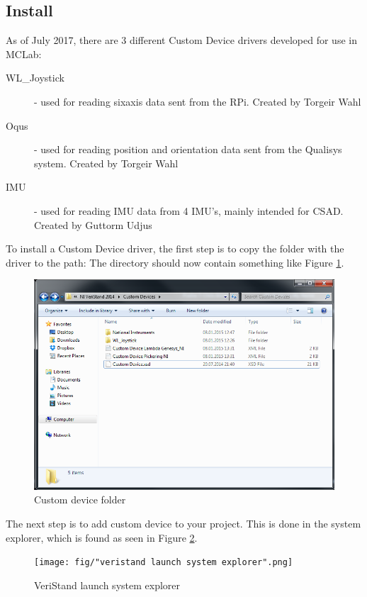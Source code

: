 \subsection{Install}\label{subsec: Installing custom device driver}
As of July 2017, there are 3 different Custom Device drivers developed for use in MCLab: 
\begin{description}
	\item [WL\_Joystick] - used for reading sixaxis data sent from the RPi. Created by Torgeir Wahl
	\item [Oqus] - used for reading position and orientation data sent from the Qualisys system. Created by Torgeir Wahl
	\item [IMU] - used for reading IMU data from 4 IMU's, mainly intended for CSAD. Created by Guttorm Udjus
\end{description}
To install a Custom Device driver, the first step is to copy the folder with the driver to the path: 
The directory should now contain something like Figure \ref{fig: custom device folder}.
\begin{figure}[htb!]
	\centering \includegraphics[scale=0.45]{fig/custom_devices_folder.png}
	\caption{Custom device folder}
	\label{fig: custom device folder} 
\end{figure}
The next step is to add custom device to your project. This is done in the system explorer, which is found as seen in Figure \ref{fig: veristand launch system explorer}.
\begin{figure}[htb!]
	\centering \texttt{[image: fig/"veristand launch system explorer".png]}
	\caption{VeriStand launch system explorer}
	\label{fig: veristand launch system explorer} 
\end{figure}
